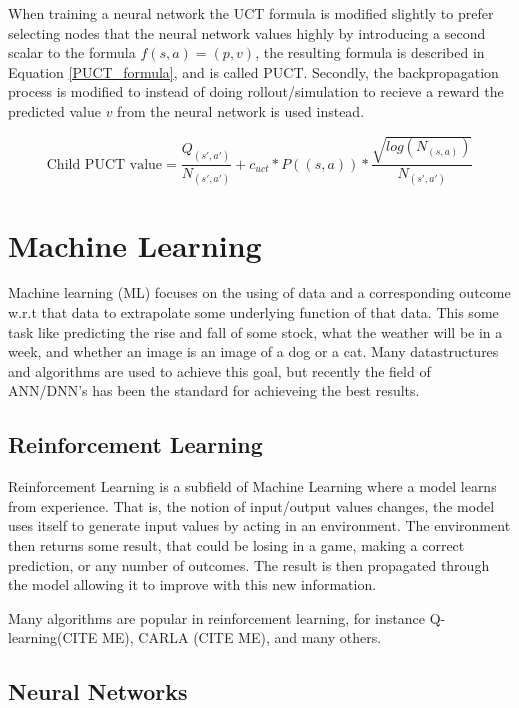 When training a neural network the UCT formula is modified slightly to prefer selecting nodes
that the neural network values highly by introducing a second scalar to the formula $f(s,a) = (p,v)$,
the resulting formula is described in Equation \ref{PUCT_formula}, and is called PUCT. Secondly, the backpropagation process
is modified to instead of doing rollout/simulation to recieve a reward the predicted value $v$ from
the neural network is used instead.

\begin{equation} \label{PUCT_formula}
  \text{Child PUCT value} = \frac{Q_{(s',a')}}{N_{(s',a')}} + c_{uct} * P((s,a)) * \frac{\sqrt{log(N_{(s,a)})}}{N_{(s',a')}}
\end{equation}

\section{Machine Learning}

Machine learning (ML) focuses on the using of data and a corresponding outcome w.r.t that data to 
extrapolate some underlying function of that data. This some task like predicting the 
rise and fall of some stock, what the weather will be in a week, and whether an image 
is an image of a dog or a cat. Many datastructures and algorithms are used to achieve this 
goal, but recently the field of ANN/DNN's has been the standard for achieveing the best
results.

\subsection{Reinforcement Learning}

Reinforcement Learning is a subfield of Machine Learning where a model learns from experience.
That is, the notion of input/output values changes, the model uses itself to generate input
values by acting in an environment. The environment then returns some result, that could be
losing in a game, making a correct prediction, or any number of outcomes. The result is then
propagated through the model allowing it to improve with this new information.

Many algorithms are popular in reinforcement learning, for instance Q-learning(CITE ME), CARLA (CITE ME), 
and many others. 

\subsection{Neural Networks}

